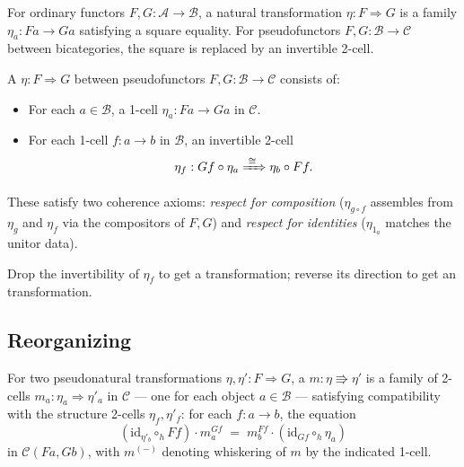 For ordinary functors $F, G : \mathcal{A} \to \mathcal{B}$, a natural
transformation $\eta : F \Rightarrow G$ is a family $\eta_a : Fa \to Ga$
satisfying a square equality. For pseudofunctors $F, G : \mathcal{B} \to
\mathcal{C}$ between bicategories, the square is replaced by an invertible
2-cell.

\begin{definition}
\label{def:pseudonat}
A  $\eta : F \Rightarrow G$ between
pseudofunctors $F, G : \mathcal{B} \to \mathcal{C}$ consists of:
\begin{itemize}
  \item For each $a \in \mathcal{B}$, a 1-cell $\eta_a : Fa \to Ga$ in
        $\mathcal{C}$.
  \item For each 1-cell $f : a \to b$ in $\mathcal{B}$, an invertible 2-cell
        \begin{equation*}
          \eta_f : Gf \circ \eta_a \xRightarrow{\;\cong\;} \eta_b \circ Ff.
        \end{equation*}
\end{itemize}
These satisfy two coherence axioms: \emph{respect for composition} ($\eta_{g
\circ f}$ assembles from $\eta_g$ and $\eta_f$ via the compositors of $F, G$)
and \emph{respect for identities} ($\eta_{1_a}$ matches the unitor data).
\end{definition}

\begin{definition}
Drop the invertibility of $\eta_f$ to get a  transformation; reverse
its direction to get an  transformation.
\end{definition}

\subsection{Reorganizing}

\begin{definition}[Modification]
\label{def:modification}
For two pseudonatural transformations $\eta, \eta' : F \Rightarrow G$, a
 $m : \eta \Rrightarrow \eta'$ is a family of 2-cells
$m_a : \eta_a \Rightarrow \eta'_a$ in $\mathcal{C}$ — one for each object
$a \in \mathcal{B}$ — satisfying compatibility with the structure 2-cells
$\eta_f, \eta'_f$: for each $f : a \to b$, the equation
\begin{equation*}
  (\mathrm{id}_{\eta'_b} \circ_h Ff) \cdot m_a^{Gf} \;=\; m_b^{Ff} \cdot
  (\mathrm{id}_{Gf} \circ_h \eta_a)
\end{equation*}
in $\mathcal{C}(Fa, Gb)$, with $m^{(-)}$ denoting whiskering of $m$ by
the indicated 1-cell.
\end{definition}

